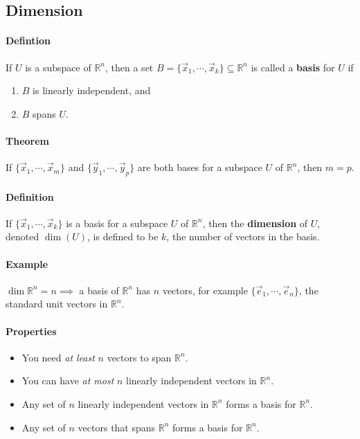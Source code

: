 \subsection{Dimension}
\paragraph*{Defintion}
If $U$ is a subspace of $\mathbb{R}^n$, then a set $B=\{\vec{x}_1, \cdots, \vec{x}_k\} \subseteq \mathbb{R}^n$ is called a \textbf{basis} for $U$ if 
\begin{enumerate}
    \item $B$ is linearly independent, and
    \item $B$ spans $U$.
\end{enumerate}

\paragraph*{Theorem}
If $\{\vec{x}_1, \cdots, \vec{x}_m\}$ and $\{\vec{y}_1, \cdots, \vec{y}_p\}$ are both bases for a subspace $U$ of $\mathbb{R}^n$, then $m=p$.

\paragraph*{Definition}
If $\{\vec{x}_1, \cdots, \vec{x}_k\}$ is a basis for a subspace $U$ of $\mathbb{R}^n$, then the \textbf{dimension} of $U$, denoted $\dim(U)$, is defined to be $k$, the number of vectors in the basis.

\paragraph*{Example}
$\dim{\mathbb{R}^n}=n \implies$ a basis of $\mathbb{R}^n$ has $n$ vectors, for example $\{\vec{e}_1, \cdots, \vec{e}_n\}$, the standard unit vectors in $\mathbb{R}^n$.

\paragraph*{Properties}
\begin{itemize}
    \item You need \emph{at least} $n$ vectors to span $\mathbb{R}^n$.
    \item You can have \emph{at most} $n$ linearly independent vectors in $\mathbb{R}^n$.
    \item Any set of $n$ linearly independent vectors in $\mathbb{R}^n$ forms a basis for $\mathbb{R}^n$.
    \item Any set of $n$ vectors that spans $\mathbb{R}^n$ forms a basis for $\mathbb{R}^n$.
\end{itemize}

